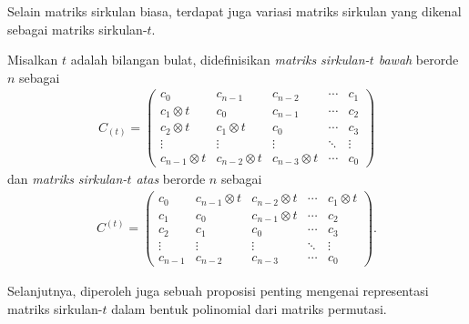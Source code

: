 Selain matriks sirkulan biasa, terdapat juga variasi matriks sirkulan yang dikenal sebagai matriks sirkulan-$t$.
\begin{definisi}
  Misalkan $t$ adalah bilangan bulat, didefinisikan \textit{matriks sirkulan-$t$ bawah} berorde $n$ sebagai
  \begin{align*}
    C_{(t)} =
    \begin{pmatrix}
      c_0               & c_{n-1}           & c_{n-2}           & \cdots & c_1    \\
      c_1 \otimes t     & c_0               & c_{n-1}           & \cdots & c_2    \\
      c_2 \otimes t     & c_1 \otimes t     & c_0               & \cdots & c_3    \\
      \vdots            & \vdots            & \vdots            & \ddots & \vdots \\
      c_{n-1} \otimes t & c_{n-2} \otimes t & c_{n-3} \otimes t & \cdots & c_0
    \end{pmatrix}
  \end{align*}
  dan \textit{matriks sirkulan-$t$ atas} berorde $n$ sebagai
  \begin{align*}
    C^{(t)} =
    \begin{pmatrix}
      c_0     & c_{n-1} \otimes t & c_{n-2} \otimes t & \cdots & c_1 \otimes t \\
      c_1     & c_0               & c_{n-1} \otimes t & \cdots & c_2           \\
      c_2     & c_1               & c_0               & \cdots & c_3           \\
      \vdots  & \vdots            & \vdots            & \ddots & \vdots        \\
      c_{n-1} & c_{n-2}           & c_{n-3}           & \cdots & c_0
    \end{pmatrix}.
  \end{align*}
\end{definisi}

Selanjutnya, diperoleh juga sebuah proposisi penting mengenai representasi matriks sirkulan-$t$ dalam bentuk polinomial dari matriks permutasi.

